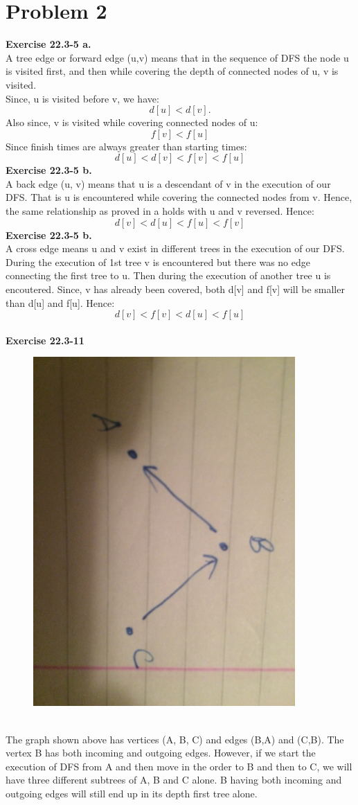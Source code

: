 \documentclass[10pt]{article}
\begin{document}
\section{Problem 2}
\textbf{Exercise 22.3-5 a.}\\
A tree edge or forward edge (u,v) means that in the sequence of DFS the node u is visited first, and then while covering the depth of connected nodes of u, v is visited.\\
Since, u is visited before v, we have: $$d[u] < d[v].$$
Also since, v is visited while covering connected nodes of u: $$f[v] < f[u]$$
Since finish times are always greater than starting times: $$ d[u] <  d[v] < f[v] < f[u]$$
\textbf{Exercise 22.3-5 b.}\\
A back edge (u, v) means that u is a descendant of v in the execution of our DFS. That is u is encountered while covering the connected nodes from v. Hence, the same relationship as proved in a holds with u and v reversed. Hence: $$ d[v] <  d[u] < f[u] < f[v]$$
\textbf{Exercise 22.3-5 b.}\\
A cross edge means u and v exist in different trees in the execution of our DFS. During the execution of 1st tree v is encountered but there was no edge connecting the first tree to u. Then during the execution of another tree u is encoutered. Since, v has already been covered, both d[v] and f[v] will be smaller than d[u] and f[u]. Hence:
$$d[v] < f[v] < d[u] < f[u]$$\\
\textbf{Exercise 22.3-11}\\
\begin{figure}[ht!]
\includegraphics[width=100mm]{IMG_2508.JPG}
\end{figure}\\
The graph shown above has vertices (A, B, C) and edges (B,A) and (C,B). The vertex B has both incoming and outgoing edges. However, if we start the execution of DFS from A and then move in the order to B and then to C, we will have three different subtrees of A, B and C alone. B having both incoming and outgoing edges will still end up in its depth first tree alone.
\newpage
\end{document}
